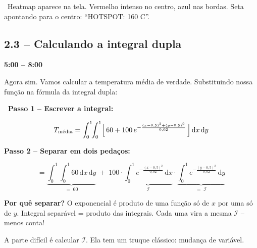 \documentclass[12pt, a4paper]{article}
\newcommand{\tempo}[1]{%
  \noindent\hfill
  {\small\sffamily\color{corTempo}%
   \faStopwatch\enspace\textbf{#1}}%
  \par\vspace{2pt}%
}
\begin{document}
\begin{visual}
\faFilm\ Heatmap aparece na tela. Vermelho intenso no centro, azul nas bordas.
Seta apontando para o centro: ``HOTSPOT: 160 {\textdegree}C''.
\end{visual}

\subsection{2.3 -- Calculando a integral dupla}
\tempo{5:00 -- 8:00}

\begin{fala}
Agora sim. Vamos calcular a temperatura média de verdade.
Substituindo nossa função na fórmula da integral dupla:
\end{fala}

\begin{mathblock}
\textbf{\color{corMath}\faSuperscript\ Passo 1 -- Escrever a integral:}

\[
  T_{\text{média}}
  = \int_0^1\!\!\int_0^1
    \Bigl[\,60 + 100\,e^{-\frac{(x-0{,}5)^2+(y-0{,}5)^2}{0{,}02}}\,\Bigr]
    \,\mathrm{d}x\,\mathrm{d}y
\]

\textbf{\color{corMath}Passo 2 -- Separar em dois pedaços:}

\[
  = \underbrace{\int_0^1\!\!\int_0^1 60\,\mathrm{d}x\,\mathrm{d}y}_{=\;60}
  \;+\;
  100
  \cdot
  \underbrace{\int_0^1 e^{-\frac{(x-0{,}5)^2}{0{,}02}}\,\mathrm{d}x}_{\mathcal{I}}
  \cdot
  \underbrace{\int_0^1 e^{-\frac{(y-0{,}5)^2}{0{,}02}}\,\mathrm{d}y}_{=\;\mathcal{I}}
\]

{\small\color{gray}\textbf{Por quê separar?} O exponencial é produto de uma função só
de $x$ por uma só de $y$. Integral separável = produto das integrais. Cada uma vira
a mesma $\mathcal{I}$ -- menos conta!}
\end{mathblock}

\begin{fala}
A parte difícil é calcular $\mathcal{I}$. Ela tem um truque clássico:
mudança de variável.
\end{fala}
\end{document}
